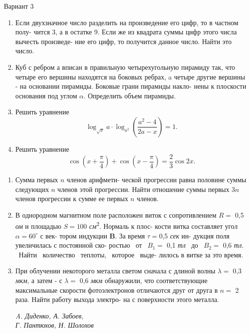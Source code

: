 \begin{spacing}{0.8}
\begin{multicols}{2}
{\lsstyle Вариант 3}

\begin{enumerate}[wide=0pt, labelindent=15pt, label=\textbf{\arabic*}.]
    \itemsep0em
    \item Если двухзначное число разделить на
произведение его цифр, то в частном полу-
чится 3, а в остатке 9. Если же из квадрата
суммы цифр этого числа вычесть произведе-
ние его цифр, то получится данное число.
Найти это
число.
    \item Куб с ребром а вписан в правильную
    четырехугольную пирамиду так, что четыре
    его вершины находятся на боковых ребрах,
    a четыре другие вершины - на основании
    пирамиды. Боковые грани пирамиды накло-
    нены к плоскости основания под углом $\alpha$.
    Определить объем пирамиды.
    \item Решить уравнение
    \[
    \log_{\sqrt{x}}{a} \cdot \log_{a^2}{\left(\frac{a^2-4}{2a-x}\right)} = 1.
    \]
    \item Решить уравнение
    \[ 
    \cos{\left(x+\frac{\pi}{4}\right)} + \cos{\left(x-\frac{\pi}{4}\right)} = \frac{2}{3}\cos{2x}.
    \]
\end{enumerate}



\begin{enumerate}[wide=0pt, labelindent=15pt, itemsep=0pt, label=\textbf{\arabic*}.]
    \item Сумма первых $n$ членов арифмети-
    ческой прогрессии равна половине суммы
    следующих $n$ членов этой прогрессии. Найти
    отношение суммы первых $3n$ 
    членов прогрессии к сумме ее первых $n$ членов.
    \item В однородном
    магнитном поле расположен виток с сопротивлением $R =$ 0,5 \textit{ом}
    и площадью $S = 100$ \textit{см}\textsuperscript{2}. Нормаль к плос-
    кости витка составляет угол $\alpha = 60^{\circ}$ с век-
    тором индукции \textbf{B}. За время $\tau= 0$,5 \textit{сек} ин-
    дукция поля увеличилась с постоянной ско-
    ростью \ от \ $ B_1 =$ 0,1 \textit{тл} \ до \ $B_2=$ 0,6 \textit{тл}. \
    Найти \ количество \ теплоты, \ которое \ выде-
    лилось в витке за это время.
    \item При облучении
    некоторого металла
    светом сначала с длиной волны $\lambda =$ 0,3 \textit{мкм},
    а затем - с $\lambda =$ 0,6 \textit{мкм} обнаружили, что
    соответствующие
    максимальные скорости
    фотоэлектронов отличаются друг от друга
    в $n=$ 2 раза. Найти работу выхода электро-
    на с поверхности этого металла.
    \begin{flushright}
        \textit{
        A. Диденко, А. Забоев, \\
        Г. Пантюхов, Н. Шолохов
        }
    \end{flushright}
\end{enumerate}
\end{multicols}


\end{spacing}
